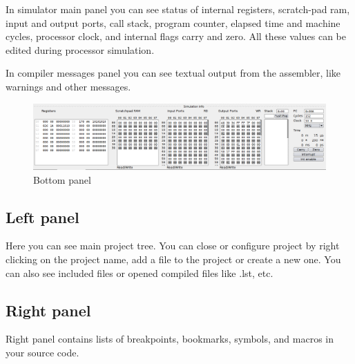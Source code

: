         In simulator main panel you can see status of internal registers, scratch-pad ram, input and output ports, call
        stack, program counter, elapsed time and machine cycles, processor clock, and internal flags carry and zero. All
        these values can be edited during processor simulation.

        In compiler messages panel you can see textual output from the assembler, like warnings and other messages.

        \begin{figure}[h!]
            \centering
            \includegraphics[width=\textwidth]{img/bottom_panel.png}
            \caption{Bottom panel}
        \end{figure}

    \subsection{Left panel}
        Here you can see main project tree. You can close or configure project by right clicking on the project name, add a
        file to the project or create a new one. You can also see included files or opened compiled files like .lst, etc.

    \subsection{Right panel}
        Right panel contains lists of breakpoints, bookmarks, symbols, and macros in your source code.


